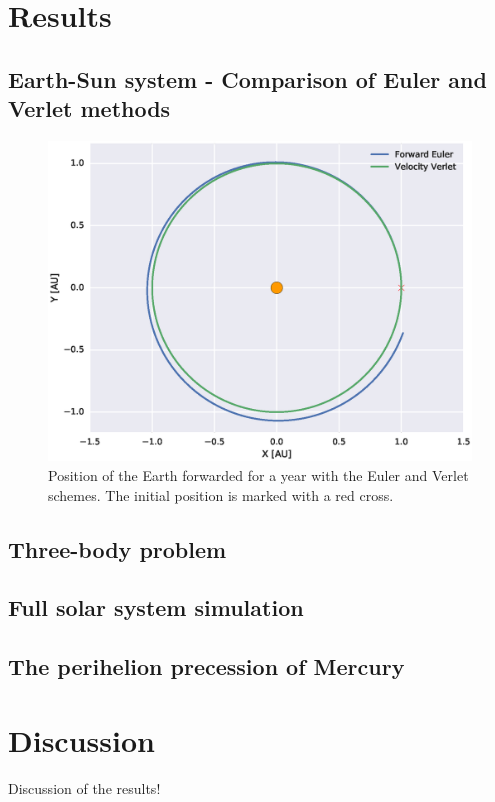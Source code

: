 \documentclass[aps,reprint]{revtex4-1}
\begin{document}
\section{Results}
\label{sec:results}
\subsection{Earth-Sun system - Comparison of Euler and Verlet methods}
\begin{figure}[H]
  \centering
  \includegraphics[width=\columnwidth]{figures/eulerverlet.eps}
  \caption{Position of the Earth forwarded for a year with the Euler and Verlet
  schemes. The initial position is marked with a red cross.}
  \label{fig:earthsunorbits}
\end{figure}
\subsection{Three-body problem}
\subsection{Full solar system simulation}
\subsection{The perihelion precession of Mercury}

\section{Discussion}
\label{sec:discussion}
Discussion of the results!
\end{document}
